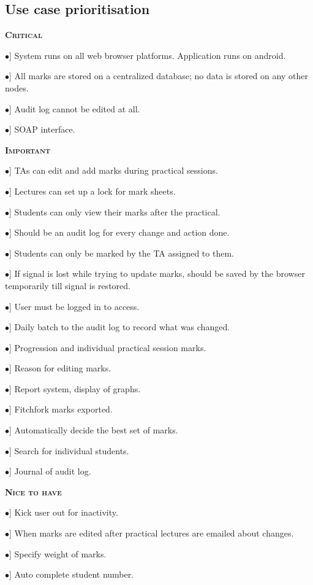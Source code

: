 \documentclass[12pt, a4paper]{scrartcl}
\newcommand{\tab}[1]{\hspace{.05\textwidth}\rlap{#1}}
\begin{document}
			\subsection{Use case prioritisation}
				\textsc{\bf Critical}
				\begin{description}
					\item \tab [$\bullet$] System runs on all web browser platforms.
				Application runs on android.
					\item \tab [$\bullet$] All marks are stored on a centralized database; no data is stored on any other nodes.
					\item \tab [$\bullet$] Audit log cannot be edited at all.
					\item \tab [$\bullet$] SOAP interface.
				\end{description}
				\textsc{\bf Important}
				\begin{description}
					\item \tab [$\bullet$] TAs can edit and add marks during practical sessions.
					\item \tab [$\bullet$] Lectures can set up a lock for mark sheets.
					\item \tab [$\bullet$] Students can only view their marks after the practical.
					\item \tab [$\bullet$] Should be an audit log for every change and action done.
					\item \tab [$\bullet$] Students can only be marked by the TA assigned to them.
					\item \tab [$\bullet$] If signal is lost while trying to update marks, should be saved by the browser temporarily till signal is restored.
					\item \tab [$\bullet$] User must be logged in to access.
					\item \tab [$\bullet$] Daily batch to the audit log to record what was changed.
					\item \tab [$\bullet$] Progression and individual practical session marks.
					\item \tab [$\bullet$] Reason for editing marks.
					\item \tab [$\bullet$] Report system, display of graphs.
					\item \tab [$\bullet$] Fitchfork marks exported.
					\item \tab [$\bullet$] Automatically decide the best set of marks.
					\item \tab [$\bullet$] Search for individual students.
					\item \tab [$\bullet$] Journal of audit log.
				\end{description}
				\textsc{\bf Nice to have}
				\begin{description}
					\item \tab [$\bullet$] Kick user out for inactivity.
					\item \tab [$\bullet$] When marks are edited after practical lectures are emailed about changes.
					\item \tab [$\bullet$] Specify weight of marks.
					\item \tab [$\bullet$] Auto complete student number.
				\end{description}
\end{document}

